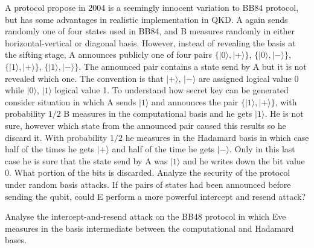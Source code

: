 \documentclass[a4paper,10pt,landscape,twocolumn]{scrartcl}
\newcommand{\ket}[1]{| #1 \rangle}
\begin{document}
\begin{exercise}
A protocol propose in 2004 is a seemingly innocent variation to BB84 protocol, but has some advantages in realistic implementation
in QKD. A again sends randomly one of four states used in BB84, and B measures randomly in either horizontal-vertical or diagonal basis. However, instead of revealing the basis at the sifting stage, A announces publicly one of four pairs $\{ \ket{0},\ket{+} \}$, $\{ \ket{0},\ket{-} \}$, $\{ \ket{1},\ket{+} \}$, $\{ \ket{1},\ket{-} \}$. The announced pair contains a state send by A but it is not revealed which one. The convention is that $\ket{+}$, $\ket{-}$ are assigned logical value 0 while $\ket{0}$, $\ket{1}$ logical value 1. To understand how secret key can be generated consider situation in which A sends $\ket{1}$ and announces the pair $\{ \ket{1},\ket{+} \}$, with
probability $1/2$ B measures in the computational basis and he gets $\ket{1}$. He is not sure, however which state from the announced pair caused this results so he discard it. With probability $1/2$ he measures in the Hadamard basis in which case half of the times he gets $\ket{+}$ and half of the time he gets $\ket{-}$. Only in this last case he is sure that the state send by A was $\ket{1}$ and he writes down the bit value 0. What portion of the bits is discarded. Analyze the security of the protocol under random basis attacks. If the pairs of states had been announced before sending the qubit, could E perform a more powerful intercept and resend attack?
\end{exercise}

\begin{exercise}
Analyse the intercept-and-resend attack on the BB48 protocol in which Eve measures in the basis intermediate between the computational and Hadamard bases.
\end{exercise}
\end{document}
